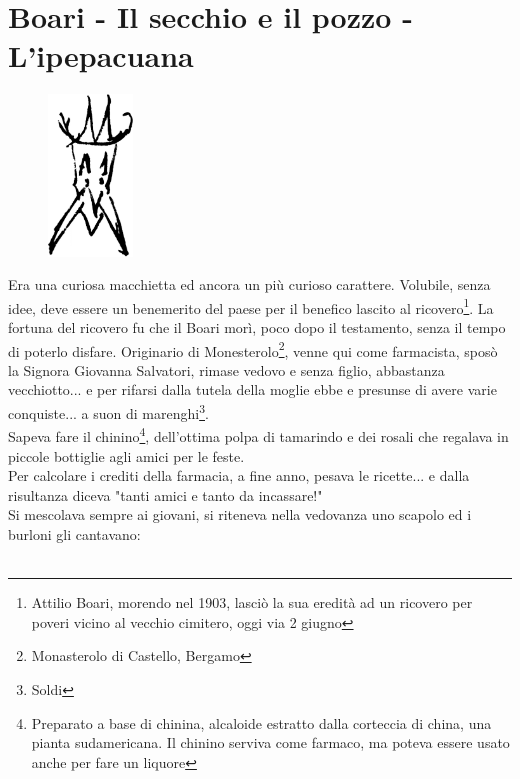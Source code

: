 \documentclass[10pt]{memoir} %
\begin{document}
\chapter{Boari - Il secchio e il pozzo - L'ipepacuana}
\begin{figure}
  \vspace{-30pt}
  \begin{center}
    \includegraphics[width=0.2\textwidth]{Boari.jpg}
  \end{center}
  \vspace{-20pt}
\end{figure}
Era una curiosa macchietta ed ancora un più curioso carattere. Volubile, senza idee, deve essere un benemerito del paese per il benefico lascito al ricovero\footnote{Attilio Boari, morendo nel 1903, lasciò la sua eredità ad un ricovero per poveri vicino al vecchio cimitero, oggi via 2 giugno}. La fortuna del ricovero fu che il Boari morì, poco dopo il testamento, senza il tempo di poterlo disfare. Originario di Monesterolo\footnote{Monasterolo di Castello, Bergamo}, venne qui come farmacista, sposò la Signora Giovanna Salvatori, rimase vedovo e senza figlio, abbastanza vecchiotto... e per rifarsi dalla tutela della moglie ebbe e presunse di avere varie conquiste... a suon di marenghi\footnote{Soldi}.\\
Sapeva fare il chinino\footnote{Preparato a base di chinina, alcaloide estratto dalla corteccia di china, una pianta sudamericana. Il chinino serviva come farmaco, ma poteva essere usato anche per fare un liquore}, dell'ottima polpa di tamarindo e dei rosali che regalava in piccole bottiglie agli amici per le feste.\\
Per calcolare i crediti della farmacia, a fine anno, pesava le ricette... e dalla risultanza diceva "tanti amici e tanto da incassare!"\\
Si mescolava sempre ai giovani, si riteneva nella vedovanza uno scapolo ed i burloni gli cantavano:\\\\
\end{document}

